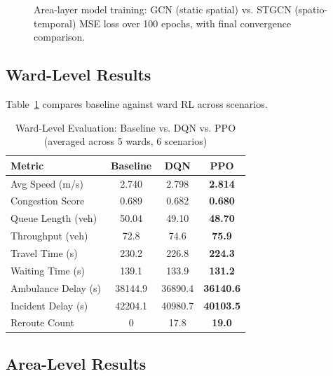 \documentclass[conference]{IEEEtran}
\begin{document}
\begin{figure}[!t]
\centering
{}
\caption{Area-layer model training: GCN (static spatial) vs. STGCN
(spatio-temporal) MSE loss over 100 epochs, with final convergence comparison.}
\label{fig:gnn_loss}
\end{figure}

\subsection{Ward-Level Results}

Table~\ref{tab:ward_results} compares baseline against ward RL across
scenarios.

\begin{table}[!t] \caption{Ward-Level Evaluation: Baseline vs. DQN vs. PPO (averaged across 5 wards, 6 scenarios)} \label{tab:ward_results} \centering \renewcommand{\arraystretch}{1.2} \begin{tabular}{lccc} \toprule \textbf{Metric} & \textbf{Baseline} & \textbf{DQN} & \textbf{PPO} \\ \midrule Avg Speed (m/s) & 2.740 & 2.798 & \textbf{2.814} \\ Congestion Score & 0.689 & 0.682 & \textbf{0.680} \\ Queue Length (veh) & 50.04 & 49.10 & \textbf{48.70} \\ Throughput (veh) & 72.8 & 74.6 & \textbf{75.9} \\ Travel Time (s) & 230.2 & 226.8 & \textbf{224.3} \\ Waiting Time (s) & 139.1 & 133.9 & \textbf{131.2} \\ Ambulance Delay (s) & 38144.9 & 36890.4 & \textbf{36140.6} \\ Incident Delay (s) & 42204.1 & 40980.7 & \textbf{40103.5} \\ Reroute Count & 0 & 17.8 & \textbf{19.0} \\ \bottomrule \end{tabular} \end{table} 

\subsection{Area-Level Results}
\end{document}
